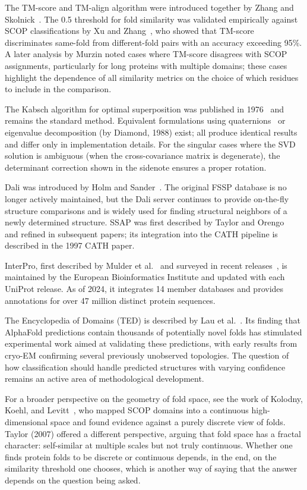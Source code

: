 The TM-score and TM-align algorithm were introduced together by Zhang and
Skolnick~\cite{zhang2005}. The 0.5 threshold for fold similarity was validated
empirically against SCOP classifications by Xu and Zhang~\cite{xu2010tm}, who showed that
TM-score discriminates same-fold from different-fold pairs with an accuracy
exceeding 95\%. A later analysis by Murzin noted cases where TM-score disagrees
with SCOP assignments, particularly for long proteins with multiple domains; these
cases highlight the dependence of all similarity metrics on the choice of which
residues to include in the comparison.

The Kabsch algorithm for optimal superposition was published in 1976~\cite{kabsch1976} and remains
the standard method. Equivalent formulations using quaternions~\cite{horn1987} or
eigenvalue decomposition (by Diamond, 1988) exist; all produce identical results
and differ only in implementation details. For the singular cases where the SVD
solution is ambiguous (when the cross-covariance matrix is degenerate), the
determinant correction shown in the sidenote ensures a proper rotation.

Dali was introduced by Holm and Sander~\cite{holm1993}. The original FSSP database is no
longer actively maintained, but the Dali server continues to provide on-the-fly
structure comparisons and is widely used for finding structural neighbors of a
newly determined structure. SSAP was first described by Taylor and Orengo~\cite{taylor1990}
and refined in subsequent papers; its integration into the CATH pipeline is
described in the 1997 CATH paper.

InterPro, first described by Mulder et al.~\cite{mulder2003} and surveyed in recent releases~\cite{blum2021}, is maintained by the European
Bioinformatics Institute and updated with each UniProt release. As of 2024, it
integrates 14 member databases and provides annotations for over 47 million
distinct protein sequences.

The Encyclopedia of Domains (TED) is described by Lau et al.~\cite{lau2024ted}.
Its finding that AlphaFold predictions contain thousands of potentially novel
folds has stimulated experimental work aimed at validating these predictions, with
early results from cryo-EM confirming several previously unobserved topologies.
The question of how classification should handle predicted structures with varying
confidence remains an active area of methodological development.

For a broader perspective on the geometry of fold space, see the work of Kolodny,
Koehl, and Levitt~\cite{kolodny2005}, who mapped SCOP domains into a continuous
high-dimensional space and found evidence against a purely discrete view of folds.
Taylor (2007) offered a different perspective, arguing that fold space has a
fractal character: self-similar at multiple scales but not truly continuous.
Whether one finds protein folds to be discrete or continuous depends, in the end,
on the similarity threshold one chooses, which is another way of saying that the
answer depends on the question being asked.
